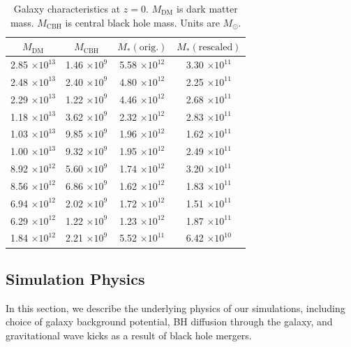 \documentclass[fleqn,usenatbib,useAMS]{mnras}
\begin{document}
\begin{table}
\begin{center}
\caption{Galaxy characteristics at $z=0$. $M_\mathrm{DM}$ is dark matter mass.  $M_\mathrm{CBH}$ is central black hole mass.  Units are $M_{\odot}$.}
\begin{tabular} {|c | c | c| c|}
\hline
$M_\mathrm{DM}$ & $M_\mathrm{CBH}$ & $M_{*} \mathrm{(orig.)}$ & $M_{*} \mathrm{(rescaled)}$ \\
\hline
 2.85 $\times 10^{13}$ 	&	 1.46 $\times 10^9$	&	5.58 $\times 10^{12}$ 	&	3.30 $\times 10^{11}$  \\
 2.48 $\times 10^{13}$ 	&	 2.40 $\times 10^9$	&	4.80 $\times 10^{12}$ 	&	2.25 $\times 10^{11}$  \\
 2.29 $\times 10^{13}$ 	&	 1.22 $\times 10^9$	&	4.46 $\times 10^{12}$ 	&	2.68 $\times 10^{11}$  \\
 1.18 $\times 10^{13}$ 	&	 3.62 $\times 10^9$	&	2.32 $\times 10^{12}$ 	&	2.83 $\times 10^{11}$  \\
 1.03 $\times 10^{13}$ 	&	 9.85 $\times 10^9$	&	1.96 $\times 10^{12}$ 	&	1.62 $\times 10^{11}$  \\
 1.00 $\times 10^{13}$ 	&	 9.32 $\times 10^9$	&	1.95 $\times 10^{12}$ 	&	2.49 $\times 10^{11}$  \\
 8.92 $\times 10^{12}$ 	&	 5.60 $\times 10^9$	&	1.74 $\times 10^{12}$ 	&	3.20 $\times 10^{11}$  \\
 8.56 $\times 10^{12}$ 	&	 6.86 $\times 10^9$	&	1.62 $\times 10^{12}$ 	&	1.83 $\times 10^{11}$  \\
 6.94 $\times 10^{12}$ 	&	 2.02 $\times 10^9$	&	1.72 $\times 10^{12}$ 	&	1.51 $\times 10^{11}$  \\
 6.29 $\times 10^{12}$ 	&	 1.22 $\times 10^9$	&	1.23 $\times 10^{12}$ 	&	1.87 $\times 10^{11}$  \\
 1.84 $\times 10^{12}$ 	&	 2.21 $\times 10^9$	&	5.52 $\times 10^{11}$ 	&	6.42 $\times 10^{10}$  \\
\hline
\end{tabular}
\end{center}
\label{table:gal_char}
\end{table}

\subsection{Simulation Physics}
In this section, we describe the underlying physics of our simulations, including choice of galaxy background potential, BH diffusion through the galaxy, and gravitational wave kicks as a result of black hole mergers.
\end{document}
